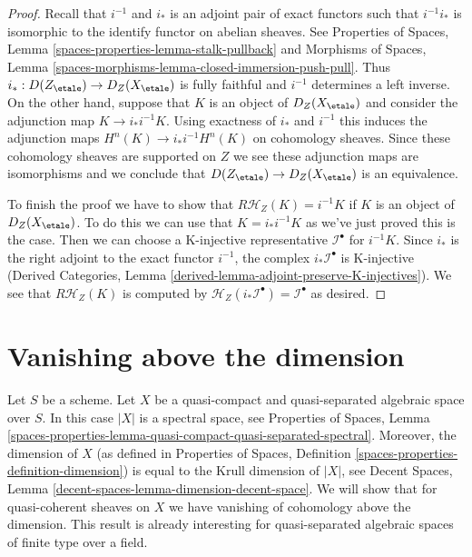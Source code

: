 \begin{proof}
Recall that $i^{-1}$ and $i_*$ is an adjoint pair of
exact functors such that $i^{-1}i_*$ is isomorphic to the identify
functor on abelian sheaves. See
Properties of Spaces, Lemma
\ref{spaces-properties-lemma-stalk-pullback} and
Morphisms of Spaces, Lemma
\ref{spaces-morphisms-lemma-closed-immersion-push-pull}.
Thus $i_* : D(Z_\etale) \to D_Z(X_\etale)$ is fully faithful and
$i^{-1}$ determines
a left inverse. On the other hand, suppose that $K$ is an object of
$D_Z(X_\etale)$ and consider the adjunction map
$K \to i_*i^{-1}K$.
Using exactness of $i_*$ and $i^{-1}$
this induces the adjunction maps
$H^n(K) \to i_*i^{-1}H^n(K)$ on cohomology sheaves.
Since these cohomology
sheaves are supported on $Z$ we see these adjunction maps are isomorphisms
and we conclude that $D(Z_\etale) \to D_Z(X_\etale)$ is an equivalence.

\medskip\noindent
To finish the proof we have to show that $R\mathcal{H}_Z(K) = i^{-1}K$
if $K$ is an object of $D_Z(X_\etale)$. To do this we can use that
$K = i_*i^{-1}K$
as we've just proved this is the case. Then we
can choose a K-injective representative $\mathcal{I}^\bullet$ for
$i^{-1}K$.
Since $i_*$ is the right adjoint to the exact functor
$i^{-1}$, the
complex $i_*\mathcal{I}^\bullet$ is K-injective
(Derived Categories, Lemma \ref{derived-lemma-adjoint-preserve-K-injectives}).
We see that $R\mathcal{H}_Z(K)$ is computed by
$\mathcal{H}_Z(i_*\mathcal{I}^\bullet) = \mathcal{I}^\bullet$
as desired.
\end{proof}






\section{Vanishing above the dimension}
\label{section-vanishing-above-dimension}

\noindent
Let $S$ be a scheme. Let $X$ be a quasi-compact and quasi-separated
algebraic space over $S$. In this case $|X|$ is a spectral space, see
Properties of Spaces, Lemma
\ref{spaces-properties-lemma-quasi-compact-quasi-separated-spectral}.
Moreover, the dimension of $X$ (as defined in
Properties of Spaces, Definition \ref{spaces-properties-definition-dimension})
is equal to the Krull dimension of $|X|$, see
Decent Spaces, Lemma \ref{decent-spaces-lemma-dimension-decent-space}.
We will show that for quasi-coherent sheaves on $X$ we have vanishing of
cohomology above the dimension. This result is already interesting for
quasi-separated algebraic spaces of finite type over a field.

